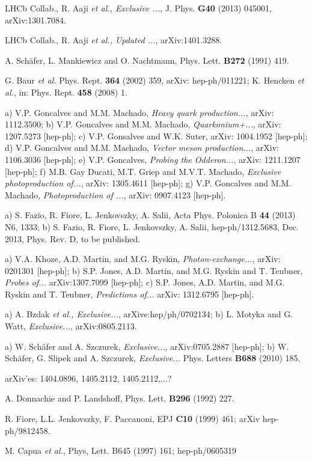 \documentclass[12pt]{article}
\begin{document}
\begin{thebibliography}{99}
 LHCb Collab., R. Aaji {\it et al., Exclusive ...}, J. Phys. {\bf G40} (2013) 045001, arXiv:1301.7084.

  LHCb Collab., R. Aaji {\it et al., Updated ...}, arXiv:1401.3288.

 A. Sch\"afer, L. Mankiewicz and O. Nachtmann, Phys. Lett. {\bf B272} (1991) 419.

 G. Baur {\it et al.} Phys. Rept. {\bf 364} (2002) 359, arXiv: hep-ph/011221; K. Hencken {\it et al.}, in: Phys. Rept. {\bf 458} (2008) 1.

 a) V.P. Goncalves and M.M. Machado, {\it Heavy quark production...}, arXiv: 1112.3500;
b) V.P. Goncalves and M.M. Machado, {\it Quarkonium+...}, arXiv: 1207.5273 [hep-ph]; c) V.P. Gonsalves and W.K. Suter, arXiv: 1004.1952 [hep-ph];
d) V.P. Goncalves and M.M. Machado, {\it Vector meson production...}, arXiv: 1106.3036 [hep-ph]; e) V.P. Goncalves, {\it Probing the Odderon...},
arXiv: 1211.1207 [hep-ph]; f) M.B. Gay Ducati, M.T. Griep and M.V.T. Machado, {\it Exclusive photoproduction of...}, arXiv: 1305.4611 [hep-ph];
g) V.P. Goncalves and M.M. Machado, {\it Photoproduction of ...}, arXiv: 0907.4123 [hep-ph].

 a) S. Fazio, R. Fiore, L. Jenkovszky, A. Salii, Acta Phys. Polonica B {\bf 44} (2013) N6, 1333; b) S. Fazio, R. Fiore, L. Jenkovszky, A. Salii,
hep-ph/1312.5683, Dec. 2013, Phys. Rev. D, to be published. 


 a) V.A. Khoze, A.D. Martin, and M.G. Ryskin, {\it Photon-exchange...}, arXiv: 0201301 [hep-ph];
b) S.P. Jones, A.D. Martin, and M.G. Ryskin and T. Teubner, {\it Probes of...} arXiv:1307.7099 [hep-ph];
c) S.P. Jones, A.D. Martin, and M.G. Ryskin and T. Teubner, {\it Predictions of...} arXiv: 1312.6795 [hep-ph].

 a) A. Bzdak {\it et al., Exclusive...}, arXive:hep/ph/0702134; b) L. Motyka and G. Watt, {\it Exclusive...}, arXiv:0805.2113.

 a) W. Sch\"afer and A. Szczurek, {\it Exclusive...}, arXiv:0705.2887 [hep-ph]; b) W. Sch\"afer, G. Slipek and A. Szczurek,
{\it Exclusive...} Phys. Letters {\bf B688} (2010) 185.

 arXiv'es: 1404.0896, 1405.2112, 1405.2112,...?

 A. Donnachie and P. Landshoff, Phys. Lett. {\bf B296} (1992) 227.

 R. Fiore, L.L. Jenkovszky, F. Paccanoni, EPJ {\bf C10} (1999) 461; arXiv hep-ph/9812458.

 M. Capua {\it et al.}, Phys, Lett. {B645} (1997) 161; hep-ph/0605319


\end{thebibliography}
\end{document}
